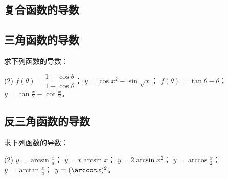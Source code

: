 \subsection{复合函数的导数}
\begin{Practice}
  \begin{question}
    \item 
    \item 
    \item 
    \item 
  \end{question}
\end{Practice}

\begin{Exercise}
  \begin{question}
    \item 
    \item 
    \item 
    \item 
    \item 
    \item 
    \item 
    \item 
    \item 
    \item 
    \item 
    \item 
    \item 
    \item 
    \item 
    \item 
  \end{question}
\end{Exercise}

\subsection{三角函数的导数}
\begin{Practice}
  求下列函数的导数：
  \begin{tasks}(2)
    \task $f(\theta)=\dfrac{1+\cos\theta}{1-\cos\theta}$；
    \task $y=\cos x^2-\sin\sqrt{x}$；
    \task $f(\theta)=\tan\theta-\theta$；
    \task $y=\tan\frac{x}{2}-\cot\frac{x}{2}$。
  \end{tasks}
\end{Practice}

\subsection{反三角函数的导数}
\begin{Practice}
  求下列函数的导数：
  \begin{tasks}(2)
    \task $y=\arcsin\frac{x}{a}$；
    \task $y=x\arcsin x$；
    \task $y=2\arcsin x^2$；
    \task $y=\arccos\frac{x}{2}$；
    \task $y=\arctan\frac{x}{a}$；
    \task $y=(\arccot x)^2$。
  \end{tasks}
\end{Practice}

